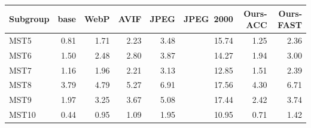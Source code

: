 \begin{tabular}{lrrrrrrr}
    \toprule
    Subgroup & base & WebP & AVIF & JPEG & JPEG~2000 & Ours-ACC & Ours-FAST \\
    \midrule
    MST5  & 0.81 & 1.71 & 2.23 & 3.48 & 15.74 & 1.25 & 2.36 \\
    MST6  & 1.50 & 2.48 & 2.80 & 3.87 & 14.27 & 1.94 & 3.00 \\
    MST7  & 1.16 & 1.96 & 2.21 & 3.13 & 12.85 & 1.51 & 2.39 \\
    MST8  & 3.79 & 4.79 & 5.27 & 6.91 & 17.56 & 4.30 & 6.71 \\
    MST9  & 1.97 & 3.25 & 3.67 & 5.08 & 17.44 & 2.42 & 3.74 \\
    MST10 & 0.44 & 0.95 & 1.09 & 1.95 & 10.95 & 0.71 & 1.42 \\
    \bottomrule
  \end{tabular}
